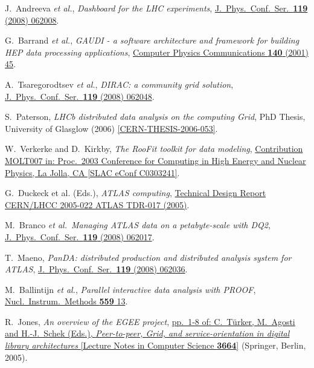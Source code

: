 \documentclass{elsart}
\def\etal {\textit{et al.}}
\begin{document}
\begin{thebibliography}{00}
 J.~Andreeva \etal,
\textit{Dashboard for the LHC experiments},
\href{http://dx.doi.org/10.1088/1742-6596/119/6/062008}
{J.\ Phys.\ Conf.\ Ser.\ \textbf{119} (2008) 062008}.

 G.~Barrand \etal,
\textit{GAUDI - a software architecture and framework for building HEP
data processing applications},
\href{http://dx.doi.org/10.1016/S0010-4655(01)00254-5}
{Computer Physics Communications \textbf{140} (2001) 45}.

 A.~Tsaregorodtsev \etal,
\textit{DIRAC: a community grid solution},
\href{http://dx.doi.org/10.1088/1742-6596/119/6/062048}
{J.\ Phys.\ Conf.\ Ser.\ \textbf{119} (2008) 062048}.

 S.~Paterson,
\textit{LHCb distributed data analysis on the computing Grid},
PhD Thesis, University of Glasglow (2006)
\href{http://cdsweb.cern.ch/record/995676/}
{[CERN-THESIS-2006-053]}.

 W.~Verkerke and D.~Kirkby,
\textit{The RooFit toolkit for data modeling},
\href{http://www.slac.stanford.edu/econf/C0303241/proc/papers/MOLT007.PDF}
{Contribution MOLT007 in:
Proc.\ 2003 Conference for Computing in High Energy and Nuclear Physics,
La Jolla, CA [SLAC eConf C0303241]}.

 G.~Duckeck et al. (Eds.),
\textit{ATLAS computing},
\href{http://cdsweb.cern.ch/record/837738}
{Technical Design Report CERN/LHCC 2005-022 ATLAS TDR-017 (2005)}.

 M.~Branco \etal\,
\textit{Managing ATLAS data on a petabyte-scale with DQ2},
\href{http://dx.doi.org/10.1088/1742-6596/119/6/062017}
{J.~Phys.\ Conf.\ Ser.\ \textbf{119} (2008) 062017}.

 T.~Maeno,
\textit{PanDA: distributed production and distributed analysis system for
ATLAS},
\href{http://dx.doi.org/10.1088/1742-6596/119/6/062036}
{J.~Phys.\ Conf.\ Ser.\ \textbf{119} (2008) 062036}.

 M.~Ballintijn \etal,
\textit{Parallel interactive data analysis with PROOF},
\href{http://dx.doi.org/10.1016/j.nima.2005.11.100}
{Nucl.\ Instrum.\ Methods \textbf{559} 13}.

 R.~Jones,
\textit{An overview of the EGEE project},
\href{http://dx.doi.org/10.1007/11549819}
{pp.~1-8 of: C.~T\"urker, M.~Agosti and H.-J.~Schek (Eds.),
\textit{Peer-to-peer, Grid, and service-orientation in digital library
architectures}
[Lecture Notes in Computer Science \textbf{3664}]} (Springer, Berlin, 2005).


\end{thebibliography}
\end{document}
